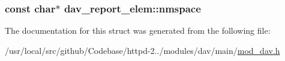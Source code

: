 \subsubsection[{\texorpdfstring{nmspace}{nmspace}}]{\setlength{\rightskip}{0pt plus 5cm}const char$\ast$ dav\+\_\+report\+\_\+elem\+::nmspace}\hypertarget{structdav__report__elem_a247f168bde74d84030471e0d6ff25a06}{}\label{structdav__report__elem_a247f168bde74d84030471e0d6ff25a06}


The documentation for this struct was generated from the following file\+:\begin{DoxyCompactItemize}
\item 
/usr/local/src/github/\+Codebase/httpd-\/2../modules/dav/main/\hyperlink{mod__dav_8h}{mod\+\_\+dav.\+h}\end{DoxyCompactItemize}
